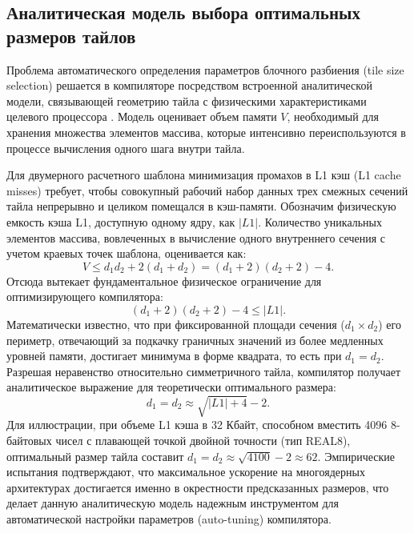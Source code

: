 \documentclass[14pt, russian]{scrartcl}
\begin{document}
\subsection{Аналитическая модель выбора оптимальных размеров тайлов}

Проблема автоматического определения параметров блочного разбиения (tile size selection) решается в компиляторе посредством встроенной аналитической модели, связывающей геометрию тайла с физическими характеристиками целевого процессора \cite{metelica2024}. Модель оценивает объем памяти $V$, необходимый для хранения множества элементов массива, которые интенсивно переиспользуются в процессе вычисления одного шага внутри тайла.

Для двумерного расчетного шаблона минимизация промахов в L1 кэш (L1 cache misses) требует, чтобы совокупный рабочий набор данных трех смежных сечений тайла непрерывно и целиком помещался в кэш-памяти. Обозначим физическую емкость кэша L1, доступную одному ядру, как $|L1|$. Количество уникальных элементов массива, вовлеченных в вычисление одного внутреннего сечения с учетом краевых точек шаблона, оценивается как:
\begin{equation}
\label{eq:volume}
V \le d_1 d_2 + 2(d_1 + d_2) = (d_1 + 2)(d_2 + 2) - 4.
\end{equation}
Отсюда вытекает фундаментальное физическое ограничение для оптимизирующего компилятора:
\begin{equation}
\label{eq:l1_limit}
(d_1 + 2)(d_2 + 2) - 4 \le |L1|.
\end{equation}
Математически известно, что при фиксированной площади сечения ($d_1 \times d_2$) его периметр, отвечающий за подкачку граничных значений из более медленных уровней памяти, достигает минимума в форме квадрата, то есть при $d_1 = d_2$. Разрешая неравенство относительно симметричного тайла, компилятор получает аналитическое выражение для теоретически оптимального размера:
\begin{equation}
\label{eq:opt_tile}
d_1 = d_2 \approx \sqrt{|L1| + 4} - 2.
\end{equation}
Для иллюстрации, при объеме L1 кэша в 32 Кбайт, способном вместить 4096 8-байтовых чисел с плавающей точкой двойной точности (тип REAL8), оптимальный размер тайла составит $d_1 = d_2 \approx \sqrt{4100} - 2 \approx 62$. Эмпирические испытания подтверждают, что максимальное ускорение на многоядерных архитектурах достигается именно в окрестности предсказанных размеров, что делает данную аналитическую модель надежным инструментом для автоматической настройки параметров (auto-tuning) компилятора.
\end{document}
